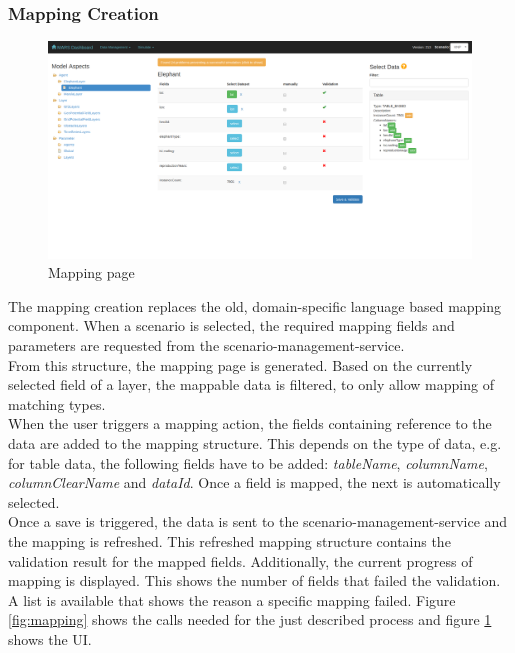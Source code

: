 \subsubsection{Mapping Creation}
\begin{figure}[H]
	\centering\includegraphics[width=1\textwidth]{res/mapping-screen.png}
	\caption{Mapping page}
	\label{fig:mapping-screen}
\end{figure}
The mapping creation replaces the old, domain-specific language based mapping component. When a scenario is selected, the required mapping fields and parameters are requested from the scenario-management-service.\\
From this structure, the mapping page is generated. Based on the currently selected field of a layer, the mappable data is filtered, to only allow mapping of matching types.\\
When the user triggers a mapping action, the fields containing reference to the data are added to the mapping structure. This depends on the type of data, e.g. for table data, the following fields have to be added: \textit{tableName}, \textit{columnName}, \textit{columnClearName} and \textit{dataId}. Once a field is mapped, the next is automatically selected.\\
Once a save is triggered, the data is sent to the scenario-management-service and the mapping is refreshed. This refreshed mapping structure contains the validation result for the mapped fields. Additionally, the current progress of mapping is displayed. This shows the number of fields that failed the validation. A list is available that shows the reason a specific mapping failed. Figure \ref{fig:mapping} shows the calls needed for the just described process and figure \ref{fig:mapping-screen} shows the UI.
